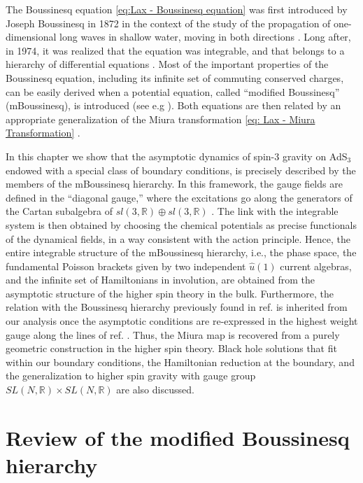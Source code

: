 \documentclass[letterpaper,11pt,oneside]{book}
\begin{document}
The Boussinesq equation \eqref{eq:Lax - Boussinesq equation} was first introduced by Joseph Boussinesq
in 1872 in the context of the study of the propagation of one-dimensional
long waves in shallow water, moving in both directions\textcolor{red}{{}
}\cite{Boussinesq1872}. Long after, in 1974, it was realized that
the equation was integrable, and that belongs to a hierarchy of differential
equations \cite{Zakharov:1974}. Most of the important properties
of the Boussinesq equation, including its infinite set of commuting
conserved charges, can be easily derived when a potential equation,
called ``modified Boussinesq'' (mBoussinesq), is introduced (see
e.g \cite{Kaup:1975}). Both equations are then related by an appropriate
generalization of the Miura transformation \eqref{eq: Lax - Miura Transformation} \cite{Hirota:1977,Fordy:1981,Drinfeld:1984qv}.

In this chapter we show that the asymptotic dynamics of spin-3 gravity on AdS$_{3}$ endowed with a special class of boundary
conditions, is precisely described by the members of the mBoussinesq
hierarchy. In this framework, the gauge fields are defined in the
``diagonal gauge,'' where the excitations go along the generators
of the Cartan subalgebra of $sl(3,\mathbb{R})\oplus sl(3,\mathbb{R})$
\cite{Grumiller:2016kcp}. The link with the integrable system is
then obtained by choosing the chemical potentials as precise functionals
of the dynamical fields, in a way consistent with the action principle.
Hence, the entire integrable structure of the mBoussinesq hierarchy,
i.e., the phase space, the fundamental Poisson brackets given by two
independent $\hat{u}\left(1\right)$ current algebras, and the infinite
set of Hamiltonians in involution, are obtained from the asymptotic
structure of the higher spin theory in the bulk. Furthermore, the
relation with the Boussinesq hierarchy previously found in ref. \cite{Perez:2016vqo}
is inherited from our analysis once the asymptotic conditions are
re-expressed in the highest weight gauge along the lines of ref. \cite{Grumiller:2016kcp}.
Thus, the Miura map is recovered from a purely geometric construction
in the higher spin theory. Black hole solutions that fit within our
boundary conditions, the Hamiltonian reduction at the boundary, and
the generalization to higher spin gravity with gauge group $SL(N,\mathbb{R})\times SL(N,\mathbb{R})$
are also discussed.


\section{Review of the modified Boussinesq hierarchy\label{sec:Review-of-the}}
\end{document}
